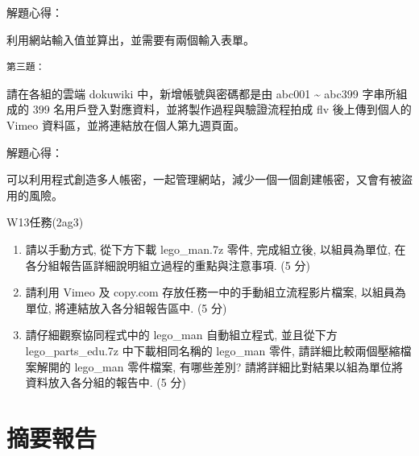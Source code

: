 \documentclass[]{article}
\newenvironment{Shaded}{}{}
\newcommand{\KeywordTok}[1]{\textcolor[rgb]{0.00,0.44,0.13}{\textbf{{#1}}}}
\newcommand{\DataTypeTok}[1]{\textcolor[rgb]{0.56,0.13,0.00}{{#1}}}
\newcommand{\DecValTok}[1]{\textcolor[rgb]{0.25,0.63,0.44}{{#1}}}
\newcommand{\CharTok}[1]{\textcolor[rgb]{0.25,0.44,0.63}{{#1}}}
\newcommand{\StringTok}[1]{\textcolor[rgb]{0.25,0.44,0.63}{{#1}}}
\newcommand{\CommentTok}[1]{\textcolor[rgb]{0.38,0.63,0.69}{\textit{{#1}}}}
\newcommand{\OtherTok}[1]{\textcolor[rgb]{0.00,0.44,0.13}{{#1}}}
\newcommand{\NormalTok}[1]{{#1}}
\begin{document}
解題心得：

利用網站輸入值並算出，並需要有兩個輸入表單。

\begin{verbatim}
第三題：
\end{verbatim}

請在各組的雲端 dokuwiki 中，新增帳號與密碼都是由 abc001
\textasciitilde{} abc399 字串所組成的 399
名用戶登入對應資料，並將製作過程與驗證流程拍成 flv 後上傳到個人的 Vimeo
資料區，並將連結放在個人第九週頁面。

\begin{Shaded}
\end{Shaded}

解題心得：

可以利用程式創造多人帳密，一起管理網站，減少一個一個創建帳密，又會有被盜用的風險。

W13任務(2ag3)

\begin{enumerate}
\def\labelenumi{\arabic{enumi}.}
\item
  請以手動方式, 從下方下載 lego\_man.7z 零件, 完成組立後, 以組員為單位,
  在各分組報告區詳細說明組立過程的重點與注意事項. (5 分)
\item
  請利用 Vimeo 及 copy.com 存放任務一中的手動組立流程影片檔案,
  以組員為單位, 將連結放入各分組報告區中. (5 分)
\item
  請仔細觀察協同程式中的 lego\_man 自動組立程式, 並且從下方
  lego\_parts\_edu.7z 中下載相同名稱的 lego\_man 零件,
  請詳細比較兩個壓縮檔案解開的 lego\_man 零件檔案, 有哪些差別?
  請將詳細比對結果以組為單位將資料放入各分組的報告中. (5 分)
\end{enumerate}

\section{摘要報告}\label{ux6458ux8981ux5831ux544a-1}
\end{document}
